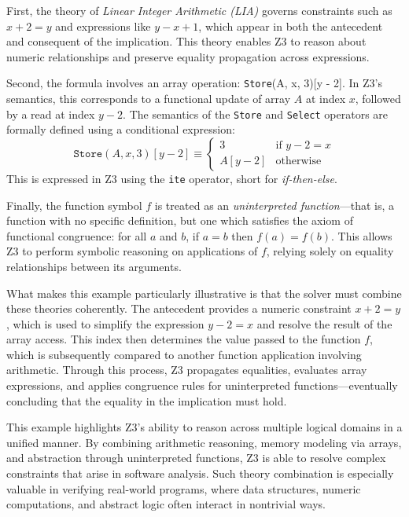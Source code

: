 \documentclass[]{rptuseminar}
\begin{document}
First, the theory of \emph{Linear Integer Arithmetic (LIA)} governs constraints such as \(x + 2 = y\) and expressions like \(y - x + 1\), which appear in both the antecedent and consequent of the implication. This theory enables Z3 to reason about numeric relationships and preserve equality propagation across expressions.

Second, the formula involves an array operation: \texttt{Store}(A, x, 3)[y - 2]. In Z3’s semantics, this corresponds to a functional update of array \(A\) at index \(x\), followed by a read at index \(y - 2\). The semantics of the \texttt{Store} and \texttt{Select} operators are formally defined using a conditional expression:
\[
    \texttt{Store}(A, x, 3)[y - 2] \equiv 
    \begin{cases}
    3 & \text{if } y - 2 = x \\
    A[y - 2] & \text{otherwise}
    \end{cases}
\]
This is expressed in Z3 using the \texttt{ite} operator, short for \emph{if-then-else}.

Finally, the function symbol \(f\) is treated as an \emph{uninterpreted function}—that is, a function with no specific definition, but one which satisfies the axiom of functional congruence: for all \(a\) and \(b\), if \(a = b\) then \(f(a) = f(b)\). This allows Z3 to perform symbolic reasoning on applications of \(f\), relying solely on equality relationships between its arguments.

What makes this example particularly illustrative is that the solver must combine these theories coherently. The antecedent provides a numeric constraint \(x + 2 = y\), which is used to simplify the expression \(y - 2 = x\) and resolve the result of the array access. This index then determines the value passed to the function \(f\), which is subsequently compared to another function application involving arithmetic. Through this process, Z3 propagates equalities, evaluates array expressions, and applies congruence rules for uninterpreted functions—eventually concluding that the equality in the implication must hold.



This example highlights Z3's ability to reason across multiple logical domains in a unified manner. By combining arithmetic reasoning, memory modeling via arrays, and abstraction through uninterpreted functions, Z3 is able to resolve complex constraints that arise in software analysis. Such theory combination is especially valuable in verifying real-world programs, where data structures, numeric computations, and abstract logic often interact in nontrivial ways.
\end{document}

